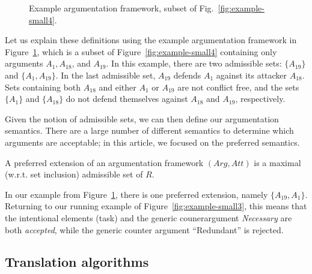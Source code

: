 \begin{figure}[ht!]
\centering
{}
\caption{Example argumentation framework, subset of Fig.~\ref{fig:example-small4}.}
\label{fig:goalmodeling:arg2}
\end{figure}

Let us explain these definitions using the example argumentation framework in Figure~\ref{fig:goalmodeling:arg2}, which is a subset of Figure~\ref{fig:example-small4} containing only arguments $A_1, A_{18}$, and $A_{19}$. In this example, there are two admissible sets: $\{A_{19}\}$ and $\{A_1, A_{19}\}$. In the last admissible set, $A_{19}$ defends $A_1$ against its attacker $A_{18}$. Sets containing both $A_{18}$ and either $A_1$ or $A_{19}$ are not conflict free, and the sets $\{A_1\}$ and $\{A_{18}\}$ do not defend themselves against $A_{18}$ and $A_{19}$, respectively. 

Given the notion of admissible sets, we can then define our argumentation semantics. There are a large number of different semantics to determine which arguments are acceptable; in this article, we focused on the preferred semantics.

\begin{definition} 
\label{def:preferred-semantics}
A preferred extension of an argumentation framework $(Arg,Att)$ is a maximal (w.r.t. set inclusion) admissible set of $R$.
\end{definition}

In our example from Figure~\ref{fig:goalmodeling:arg2}, there is one preferred extension, namely $\{A_{19},A_1\}$. Returning to our running example of Figure~\ref{fig:example-small3}, this means that the intentional elements  (task) and the generic counerargument \emph{Necessary} are both \emph{accepted}, while the generic counter argument ``Redundant'' is rejected.

\subsection{Translation algorithms}
\label{sect:formalframework:translation}

